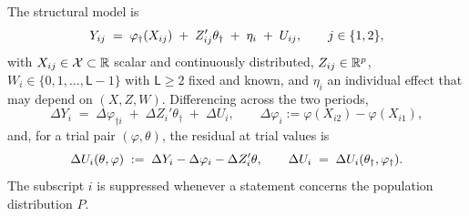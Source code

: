 
\begin{definition}\label{def:model}
The structural model is
\begin{equation}\label{eq:levels}
Y_{ij} \;=\; \varphi_{\dagger}(X_{ij}) \;+\; Z_{ij}'\theta_\dagger \;+\; \eta_i \;+\; U_{ij},
\qquad j\in\{1,2\},
\end{equation}
with $X_{ij}\in\mathcal X\subset\mathbb{R}$ scalar and continuously distributed, $Z_{ij}\in\mathbb{R}^{p}$,
$W_i\in\{0,1,\dots,\mathsf L-1\}$ with $\mathsf L\ge2$ fixed and known, and $\eta_i$ an individual effect
that may depend on $(X,Z,W)$. Differencing across
the two periods,
\begin{equation}\label{eq:diffs}
\Delta Y_i \;=\; \Delta\varphi_{\dagger i} \;+\; \Delta Z_i'\theta_\dagger \;+\; \Delta U_i,
\qquad \Delta\varphi_i:=\varphi(X_{i2})-\varphi(X_{i1}),
\end{equation}
and, for a trial pair $(\varphi,\theta)$, the residual at trial values is
\begin{equation}\label{eq:trialres}
\Delta U_i(\theta,\varphi)\;:=\;\Delta Y_i-\Delta\varphi_i-\Delta Z_i'\theta ,
\qquad \Delta U_i \;=\; \Delta U_i(\theta_\dagger,\varphi_{\dagger}).
\end{equation}
The subscript $i$ is suppressed whenever a statement concerns the population distribution $P$.
\end{definition}


